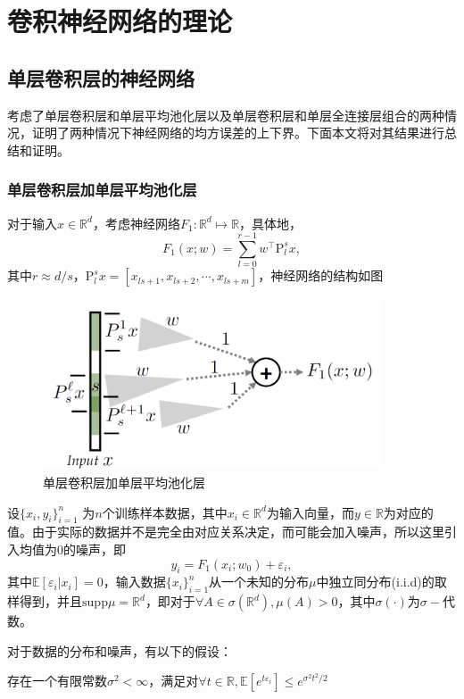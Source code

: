 \section{卷积神经网络的理论}
\subsection{单层卷积层的神经网络}
\citet{du2018many}考虑了单层卷积层和单层平均池化层以及单层卷积层和单层全连接层组合的两种情况，\citet{du2018many}证明了两种情况下神经网络的均方误差的上下界。下面本文将对其结果进行总结和证明。
\subsubsection{单层卷积层加单层平均池化层}
对于输入$x\in \mathbb{R}^d$，考虑神经网络$F_1: \mathbb{R}^d \mapsto \mathbb{R}$，具体地，
\[
  F_1(x;w) = \sum_{l=0}^{r-1}w^{\top} \mathrm{P}_l^s x,
\]
其中$r\approx d/s$，$\mathrm{P}_l^s x=[x_{ls+1},x_{ls+2},\cdots,x_{ls+m}]$，神经网络的结构如图
\begin{figure}
\centering
\includegraphics[width=10cm]{./figures/convp.PNG}
\caption{单层卷积层加单层平均池化层}
\label{fig:convp}
\end{figure}
\par
设$\{x_i,y_i\}_{i=1}^n$ 为$n$个训练样本数据，其中$x_i \in \mathbb{R}^d$为输入向量，而$y\in \mathbb{R}$为对应的值。由于实际的数据并不是完全由对应关系决定，而可能会加入噪声，所以这里引入均值为0的噪声，即
\[
  y_i = F_1(x_i;w_0)+\varepsilon_i,
\]
其中$\mathbb{E}[\varepsilon_i|x_i] = 0$，输入数据$\{x_i\}_{i=1}^n$从一个未知的分布$\mu$中独立同分布(i.i.d)的取样得到，并且$\mathrm{supp}\mu = \mathbb{R}^d$，即对于$\forall A \in \sigma(\mathbb{R}^d), \mu(A) > 0$，其中$\sigma(\cdot)$为$\sigma-$代数。
\par
对于数据的分布和噪声，有以下的假设：
\begin{assumption}
存在一个有限常数$\sigma^2< \infty$，满足对$\forall t \in \mathbb{R}, \mathbb{E}[e^{t\varepsilon_i}] \leq e^{\sigma^2t^2/2}$
\end{assumption}
